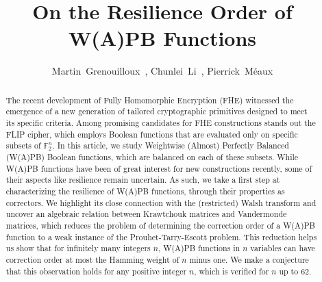 \documentclass[11pt]{llncs}
\begin{document}
\title{On the Resilience Order of W(A)PB Functions}





	\author{
			\mbox{Martin Grenouilloux },
			\mbox{Chunlei Li },
		\mbox{Pierrick M\'eaux}
	}








	\maketitle



 \setcounter{page}{1}

\begin{abstract}
The recent development of Fully Homomorphic Encryption (FHE)
witnessed the emergence of a new generation of tailored cryptographic primitives
designed to meet its specific criteria. Among promising candidates for FHE
constructions stands out the FLIP cipher, which employs Boolean functions that
are evaluated only on specific subsets of $\mathbb{F}_2^n$.
In this article, we study Weightwise (Almost) Perfectly Balanced (W(A)PB) Boolean functions, which are balanced on each of these subsets. While W(A)PB functions have been of great
interest for new constructions recently, some of their aspects like resilience
remain uncertain. As such, we take a first step at characterizing the resilience
of W(A)PB functions, through their properties as correctors. We highlight its
close connection with the (restricted) Walsh transform and uncover an algebraic
relation between Krawtchouk matrices and Vandermonde matrices, which
reduces the problem of determining the correction order of a W(A)PB function to a weak
instance of the Prouhet-Tarry-Escott problem.
This reduction helps us show that
for infinitely many integers $n$, W(A)PB functions in $n$ variables can have correction order at most the Hamming weight of $n$ minus one.
We make a conjecture that this observation holds for any positive integer $n$, which is verified for $n$ up to $62$.

\end{abstract}
\end{document}
